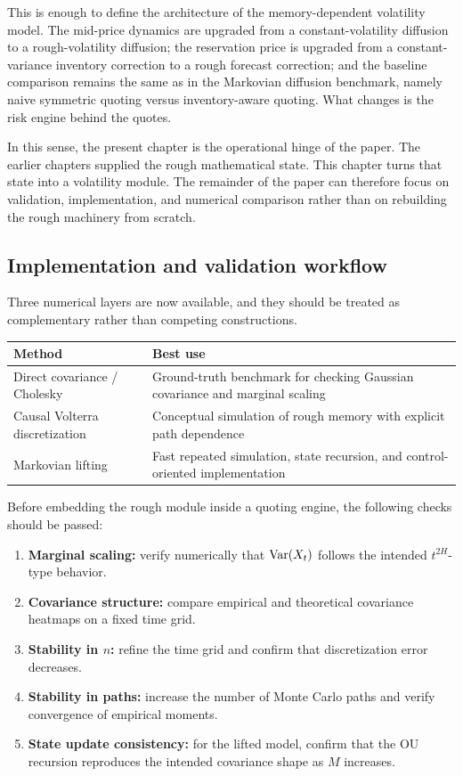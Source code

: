 This is enough to define the architecture of the memory-dependent volatility model. The mid-price dynamics are upgraded from a constant-volatility diffusion to a rough-volatility diffusion; the reservation price is upgraded from a constant-variance inventory correction to a rough forecast correction; and the baseline comparison remains the same as in the Markovian diffusion benchmark, namely naive symmetric quoting versus inventory-aware quoting. What changes is the risk engine behind the quotes.

In this sense, the present chapter is the operational hinge of the paper. The earlier chapters supplied the rough mathematical state. This chapter turns that state into a volatility module. The remainder of the paper can therefore focus on validation, implementation, and numerical comparison rather than on rebuilding the rough machinery from scratch.

\subsection{Implementation and validation workflow}

Three numerical layers are now available, and they should be treated as complementary rather than competing constructions.

\begin{center}
\begin{tabularx}{\textwidth}{@{}lX@{}}
\toprule
Method & Best use \\
\midrule
Direct covariance / Cholesky & Ground-truth benchmark for checking Gaussian covariance and marginal scaling \\
Causal Volterra discretization & Conceptual simulation of rough memory with explicit path dependence \\
Markovian lifting & Fast repeated simulation, state recursion, and control-oriented implementation \\
\bottomrule
\end{tabularx}
\end{center}

Before embedding the rough module inside a quoting engine, the following checks should be passed:
\begin{enumerate}[label=\arabic*.]
    \item \textbf{Marginal scaling:} verify numerically that \(\operatorname{Var}(X_t)\) follows the intended \(t^{2H}\)-type behavior.
    \item \textbf{Covariance structure:} compare empirical and theoretical covariance heatmaps on a fixed time grid.
    \item \textbf{Stability in \(n\):} refine the time grid and confirm that discretization error decreases.
    \item \textbf{Stability in paths:} increase the number of Monte Carlo paths and verify convergence of empirical moments.
    \item \textbf{State update consistency:} for the lifted model, confirm that the OU recursion reproduces the intended covariance shape as \(M\) increases.
\end{enumerate}

